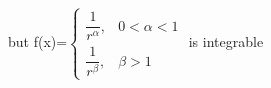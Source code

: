 \documentclass[preview]{standalone}
\begin{document}
\begin{center}
but f(x)=$\begin{cases} \dfrac{1}{r^\alpha} , & 0< \alpha <1 \\  \dfrac{1}{r^\beta} , & \beta > 1 \end{cases}$ is integrable
\end{center}
\end{document}
